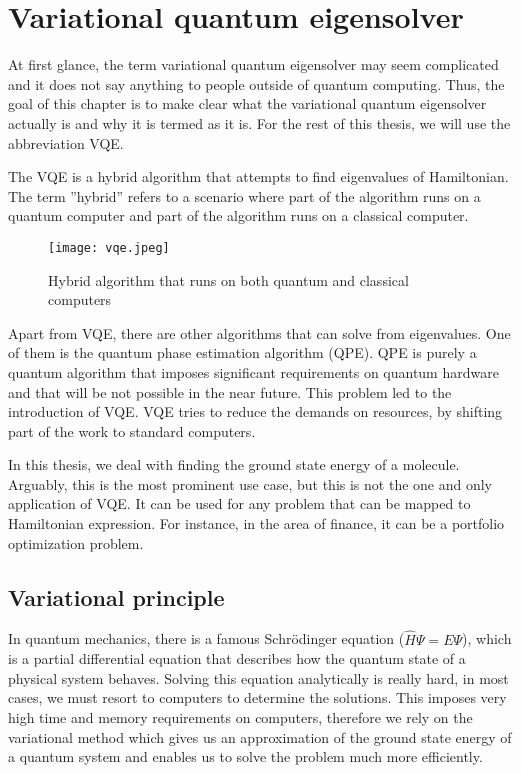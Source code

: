 \chapter{Variational quantum eigensolver}\label{ch:vqe}
At first glance, the term variational quantum eigensolver may seem complicated and it does not say anything to people outside of quantum computing. Thus, the goal of this chapter is to make clear what the variational quantum eigensolver actually is and why it is termed as it is. For the rest of this thesis, we will use the abbreviation VQE.

The VQE is a hybrid algorithm that attempts to find eigenvalues of Hamiltonian. The term ''hybrid'' refers to a scenario where part of the algorithm runs on a quantum computer and part of the algorithm runs on a classical computer.

\begin{figure}[H]
    \centering
    \texttt{[image: vqe.jpeg]}
    \caption{Hybrid algorithm that runs on both quantum and classical computers~\cite{hybrid_alg}}
\end{figure}

Apart from VQE, there are other algorithms that can solve from eigenvalues. One of them is the quantum phase estimation algorithm (QPE). QPE is purely a quantum algorithm that imposes significant requirements on quantum hardware and that will be not possible in the near future. This problem led to the introduction of VQE. VQE tries to reduce the demands on resources, by shifting part of the work to standard computers.~\cite{fedorov2021vqe}

In this thesis, we deal with finding the ground state energy of a molecule. Arguably, this is the most prominent use case, but this is not the one and only application of VQE. It can be used for any problem that can be mapped to Hamiltonian expression. For instance, in the area of finance, it can be a portfolio optimization problem.

\section{Variational principle}
In quantum mechanics, there is a famous Schrödinger equation ($\hat{H} \Psi = E \Psi$), which is a partial differential equation that describes how the quantum state of a physical system behaves. Solving this equation analytically  is really hard, in most cases, we must resort to computers to determine the solutions. This imposes very high time and memory requirements on computers, therefore we rely on the variational method which gives us an approximation of the ground state energy of a quantum system and enables us to solve the problem much more efficiently.~\cite{Thijssen_2007}

